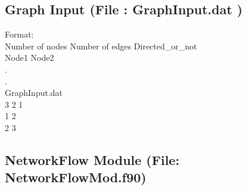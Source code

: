 \documentclass[10pt,a4paper,margin = 1.25cm]{article}
\begin{document}
\subsection*{Graph Input  (File : GraphInput.dat )}
Format:\\
Number of nodes \quad  Number of edges \quad  Directed\_or\_not\\
Node1 \quad Node2\\
.\\
.\\
GraphInput.dat\\
3 2 1\\
1 2\\
2 3\\


\subsection*{NetworkFlow Module (File: NetworkFlowMod.f90) }
\end{document}
